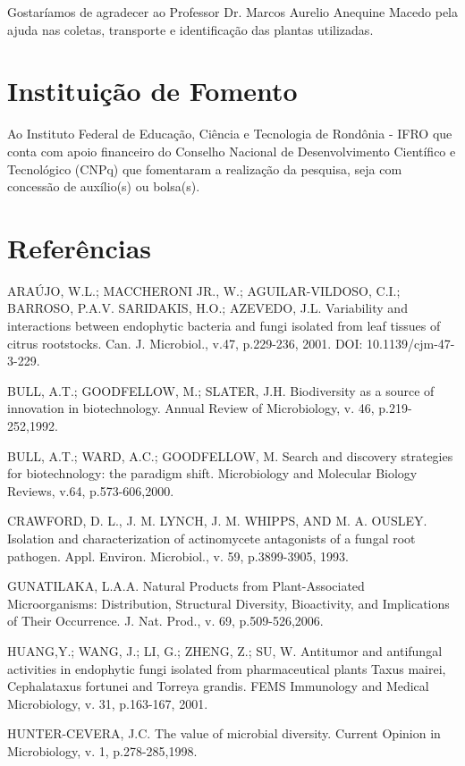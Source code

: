 \documentclass[article,12pt,onesidea,4paper,english,brazil]{abntex2}
\begin{document}
	Gostaríamos de agradecer ao Professor Dr. Marcos Aurelio Anequine Macedo pela ajuda nas coletas, transporte e identificação das plantas utilizadas.
	
	\section*{Instituição de Fomento}
	
	Ao Instituto Federal de Educação, Ciência e Tecnologia de Rondônia - IFRO que conta com apoio financeiro do Conselho Nacional de Desenvolvimento Científico e Tecnológico (CNPq) que fomentaram a realização da pesquisa, seja com concessão de auxílio(s) ou bolsa(s).
	
	\sloppy
	\section*{Referências}
	
	\noindent ARAÚJO, W.L.; MACCHERONI JR., W.; AGUILAR-VILDOSO, C.I.; BARROSO, P.A.V. SARIDAKIS, H.O.; AZEVEDO, J.L. Variability and interactions between endophytic bacteria and fungi isolated from leaf tissues of citrus rootstocks. Can. J. Microbiol., v.47, p.229-236, 2001. DOI: 10.1139/cjm-47-3-229.

	\noindent BULL, A.T.; GOODFELLOW, M.; SLATER, J.H. Biodiversity as a  source  of innovation in biotechnology. Annual Review of Microbiology, v. 46, p.219-252,1992.
	
	\noindent BULL, A.T.; WARD, A.C.; GOODFELLOW, M. Search and discovery strategies for biotechnology: the paradigm shift. Microbiology  and  Molecular  Biology  Reviews,  v.64, p.573-606,2000.
	
	\noindent CRAWFORD, D. L., J. M. LYNCH, J. M. WHIPPS, AND M. A. OUSLEY. Isolation and
	characterization of actinomycete antagonists of a fungal root pathogen. Appl. Environ. Microbiol., v. 59, p.3899-3905, 1993.
	
	\noindent GUNATILAKA, L.A.A. Natural Products from Plant-Associated Microorganisms: Distribution, Structural Diversity, Bioactivity,  and  Implications  of  Their Occurrence. J. Nat. Prod., v. 69, p.509-526,2006.
	
	\noindent HUANG,Y.; WANG, J.; LI, G.; ZHENG, Z.; SU, W. Antitumor  and  antifungal  activities in endophytic fungi isolated from pharmaceutical plants Taxus mairei, Cephalataxus fortunei and Torreya grandis. FEMS Immunology and Medical Microbiology, v. 31, p.163-167, 2001.
	
	\noindent HUNTER-CEVERA,   J.C.   The   value    of    microbial   diversity.    Current    Opinion in Microbiology, v. 1, p.278-285,1998.
	
\end{document}

